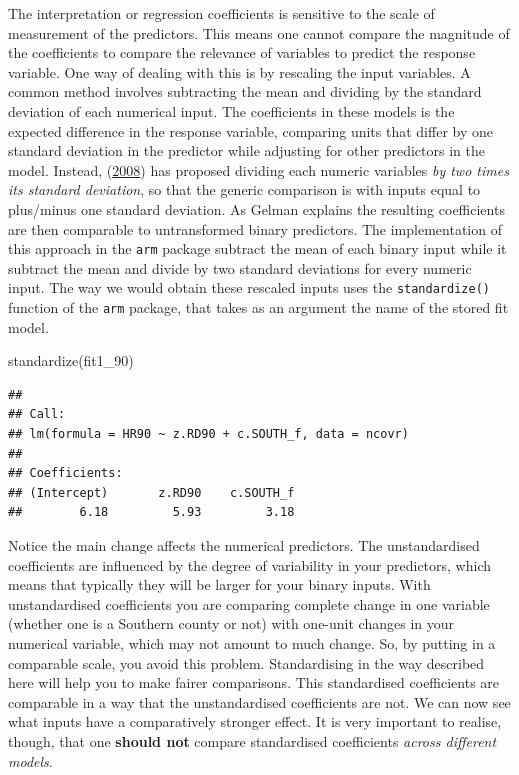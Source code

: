 \documentclass[
  krantz2]{krantz}
\makeatletter
\newenvironment{Shaded}{\begin{snugshade}}{\end{snugshade}}
\newcommand{\FunctionTok}[1]{\textcolor[rgb]{0,0,0}{#1}}
\newcommand{\NormalTok}[1]{#1}
\newenvironment{kframe}{%
\medskip{}
\setlength{\fboxsep}{.8em}
 \def\at@end@of@kframe{}%
 \ifinner\ifhmode%
  \def\at@end@of@kframe{\end{minipage}}%
  \begin{minipage}{\columnwidth}%
 \fi\fi%
 \def\FrameCommand##1{\hskip\@totalleftmargin \hskip-\fboxsep
 \colorbox{shadecolor}{##1}\hskip-\fboxsep
     \hskip-\linewidth \hskip-\@totalleftmargin \hskip\columnwidth}%
 \MakeFramed {\advance\hsize-\width
   \@totalleftmargin\z@ \linewidth\hsize
   \@setminipage}}%
 {\par\unskip\endMakeFramed%
 \at@end@of@kframe}
\renewenvironment{Shaded}{\begin{kframe}}{\end{kframe}}
\makeatother
\begin{document}
The interpretation or regression coefficients is sensitive to the scale of measurement of the predictors. This means one cannot compare the magnitude of the coefficients to compare the relevance of variables to predict the response variable. One way of dealing with this is by rescaling the input variables. A common method involves subtracting the mean and dividing by the standard deviation of each numerical input. The coefficients in these models is the expected difference in the response variable, comparing units that differ by one standard deviation in the predictor while adjusting for other predictors in the model. Instead, (\protect\hyperlink{ref-Gelman_2008}{2008}) has proposed dividing each numeric variables \emph{by two times its standard deviation}, so that the generic comparison is with inputs equal to plus/minus one standard deviation. As Gelman explains the resulting coefficients are then comparable to untransformed binary predictors. The implementation of this approach in the \texttt{arm} package subtract the mean of each binary input while it subtract the mean and divide by two standard deviations for every numeric input. The way we would obtain these rescaled inputs uses the \texttt{standardize()} function of the \texttt{arm} package, that takes as an argument the name of the stored fit model.

\begin{Shaded}
\begin{Highlighting}[]
\FunctionTok{standardize}\NormalTok{(fit1\_90)}
\end{Highlighting}
\end{Shaded}

\begin{verbatim}
## 
## Call:
## lm(formula = HR90 ~ z.RD90 + c.SOUTH_f, data = ncovr)
## 
## Coefficients:
## (Intercept)       z.RD90    c.SOUTH_f  
##        6.18         5.93         3.18
\end{verbatim}

Notice the main change affects the numerical predictors. The unstandardised coefficients are influenced by the degree of variability in your predictors, which means that typically they will be larger for your binary inputs. With unstandardised coefficients you are comparing complete change in one variable (whether one is a Southern county or not) with one-unit changes in your numerical variable, which may not amount to much change. So, by putting in a comparable scale, you avoid this problem. Standardising in the way described here will help you to make fairer comparisons. This standardised coefficients are comparable in a way that the unstandardised coefficients are not. We can now see what inputs have a comparatively stronger effect. It is very important to realise, though, that one \textbf{should not} compare standardised coefficients \emph{across different models}.
\end{document}
